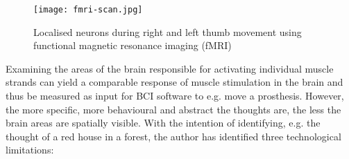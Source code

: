 \begin{figure}[ht]
  \centering
  \texttt{[image: fmri-scan.jpg]}
  \caption{Localised neurons during right and left thumb movement using functional magnetic resonance imaging (fMRI) \citep{rashid_bilateral_2018}}
  \label{fig:fmri-scan}
\end{figure}

Examining the areas of the brain responsible for activating individual muscle strands can yield a comparable response of muscle stimulation in the brain and thus be measured as input for BCI software to e.g. move a prosthesis. However, the more specific, more behavioural and abstract the thoughts are, the less the brain areas are spatially visible. With the intention of identifying, e.g. the thought of a red house in a forest, the author has identified three technological limitations:

